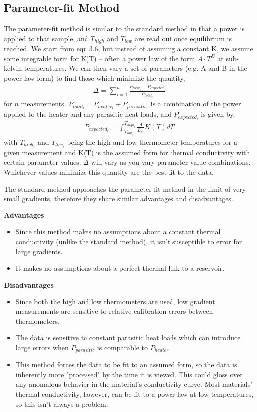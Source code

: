 \documentclass{report}
\begin{document}

\subsection{Parameter-fit Method}
The parameter-fit method is similar to the standard method in that a power is applied to that sample, and $T_{high}$ and $T_{low}$ are read out once equilibrium is reached. We start
 from eqn 3.6, but instead of assuming a constant K, we assume some integrable form for K(T) -- often a power law of the form $A \cdot T^B$ at sub-kelvin temperatures. We can then vary a set of parameters (e.g. A and B in the power law form) to find those which minimize the quantity,
\begin{eqnarray}
\Delta = \sum_{i = 1}^{n} \frac{P_{total_i} - P_{expected_i}}{P_{total_i}}
\end{eqnarray}
for $n$ measurements. $P_{total_i} = P_{heater_i} + P_{parasitic_i}$ is a combination of the power applied to the heater and any parasitic heat loads, and $P_{expected_i}$ is given by,
\begin{eqnarray}
P_{expected_i} = \int_{T_{low_i}}^{T_{high_i}} \frac{A}{L_{st}}K(T)dT
\end{eqnarray}
with $T_{high_i}$ and $T_{low_i}$ being the high and low thermometer temperatures for a given measurement and K(T) is the assumed form for thermal conductivity with certain parameter values. $\Delta$ will vary as you vary parameter value combinations. Whichever values minimize this quantity are the best fit to the data.

The standard method approaches the parameter-fit method in the limit of very small gradients, therefore they share similar advantages and disadvantages.

\bigskip

\textbf{Advantages}
\begin{itemize}
\item Since this method makes no assumptions about a constant thermal conductivity (unlike the standard method), it isn't susceptible to error for large gradients.
\item It makes no assumptions about a perfect thermal link to a reservoir.
\end{itemize}

\textbf{Disadvantages}
\begin{itemize}
\item Since both the high and low thermometers are used, low gradient measurements are sensitive to relative calibration errors between thermometers.
\item The data is sensitive to constant parasitic heat loads which can introduce large errors when $P_{parasitic}$ is comparable to $P_{heater}$.
\item This method forces the data to be fit to an assumed form, so the data is inherently more "processed" by the time it is viewed. This could gloss over any anomalous behavior in the material's conductivity curve. Most materials' thermal conductivity, however, can be fit to a power law at low temperatures, so this isn't always a problem.
\end{itemize}
\end{document}
